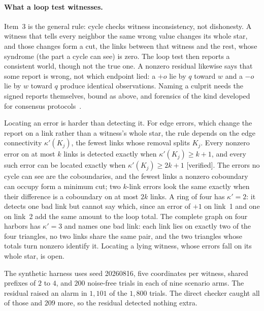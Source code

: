 \documentclass[11pt,a4paper]{article}
\theoremstyle{definition}
\theoremstyle{remark}
\begin{document}


\ifdefined\pdswisslandmarkplate
\begin{figure}[p]
  \centering
\end{figure}
\pdmarginpagebreak
\fi

\paragraph{What a loop test witnesses.}
Item~3 is the general rule: cycle checks witness inconsistency, not
dishonesty. A witness that tells every neighbor the same wrong value changes
its whole star, and those changes form a cut, the links between that witness
and the rest, whose syndrome (the part a cycle can see) is zero. The loop test
then reports a consistent world, though not the true one. A nonzero residual
likewise says that some report is wrong, not which endpoint lied: a $+o$ lie
by $q$ toward $w$ and a $-o$ lie by $w$ toward $q$ produce identical
observations. Naming a culprit needs the signed reports themselves, bound as
above, and forensics of the kind developed for consensus
protocols~.

Locating an error is harder than detecting it. For edge errors, which change
the report on a link rather than a witness's whole star, the rule depends on
the edge connectivity $\kappa'(K_j)$, the fewest links whose removal splits
$K_j$. Every nonzero error on at most $k$ links is detected exactly when
$\kappa'(K_j)\ge k+1$, and every such error can be located exactly when
$\kappa'(K_j)\ge 2k+1$ [verified]. The errors no cycle can see are the
coboundaries, and the fewest links a nonzero coboundary can occupy form a
minimum cut; two $k$-link errors look the same exactly when their difference
is a coboundary on at most $2k$ links. A ring of four has $\kappa'=2$: it
detects one bad link but cannot say which, since an error of $+1$ on link~1
and one on link~2 add the same amount to the loop total. The complete graph on
four harbors has $\kappa'=3$ and names one bad link: each link lies on exactly
two of the four triangles, no two links share the same pair, and the two
triangles whose totals turn nonzero identify it. Locating a lying witness,
whose errors fall on its whole star, is open.

The synthetic harness 
uses seed 20260816, five coordinates per witness, shared prefixes of $2$ to $4$, and
$200$ noise-free trials in each of nine scenario arms. The residual raised an
alarm in $1{,}101$ of the $1{,}800$ trials. The direct checker caught all of
those and $209$ more, so the residual detected nothing extra.
\end{document}

